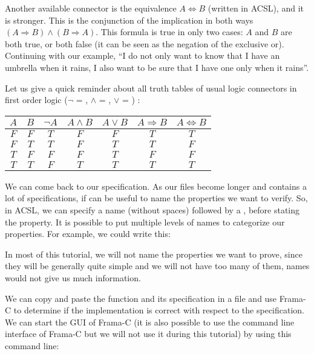 Another available connector is the equivalence $A \Leftrightarrow B$
(written  in ACSL), and it is
stronger. This is the conjunction of the implication in both ways
$(A \Rightarrow B) \wedge (B \Rightarrow A)$. This formula is true in
only two cases: $A$ and $B$ are both true, or both false (it can be seen
as the negation of the exclusive or). Continuing with our example, ``I
do not only want to know that I have an umbrella when it rains, I also
want to be sure that I have one only when it rains''.



\begin{Information}
  Let us give a quick reminder about all
  truth tables of usual logic connectors in first order logic
  ($\neg$ = \CodeInline{!}, $\wedge$ = \CodeInline{\&\&}, $\vee$ = \CodeInline{||}) :

\begin{longtabu}{|c|c|c|c|c|c|c|} \hline
$A$ & $B$ & $\neg A$ & $A \wedge B$ & $A \vee B$ & $A \Rightarrow B$ & $A \Leftrightarrow B$ \\ \hline
$F$ & $F$ & $T$ & $F$ & $F$ & $T$ & $T$ \\ \hline
$F$ & $T$ & $T$ & $F$ & $T$ & $T$ & $F$ \\ \hline
$T$ & $F$ & $F$ & $F$ & $T$ & $F$ & $F$ \\ \hline
$T$ & $T$ & $F$ & $T$ & $T$ & $T$ & $T$ \\ \hline
\end{longtabu}
\end{Information}


We can come back to our specification. As our files become longer and
contains a lot of specifications, if can be useful to name the
properties we want to verify. So, in ACSL, we can specify a name
(without spaces) followed by a \CodeInline{:}, before stating the property.
It is possible to put multiple levels of names to categorize our
properties. For example, we could write this:






In most of this tutorial, we will not name the properties we want to
prove, since they will be generally quite simple and we will not have
too many of them, names would not give us much information.

We can copy and paste the function  and its specification in
a file  and use Frama-C to determine if the implementation
is correct with respect to the specification. We can start the GUI of Frama-C
(it is also possible to use the command line interface of Frama-C but we
will not use it during this tutorial) by using this command line:



